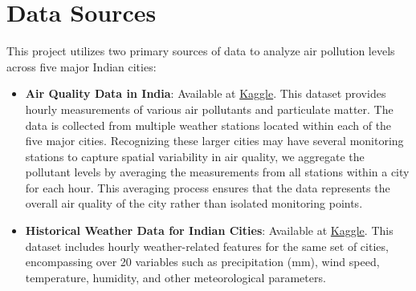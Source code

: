 \documentclass[12pt]{article}
\begin{document}





\newpage




\section{Data Sources}

This project utilizes two primary sources of data to analyze air pollution levels across five major Indian cities:

\begin{itemize}
    \item \textbf{Air Quality Data in India}: Available at \href{https://www.kaggle.com/datasets/rohanrao/air-quality-data-in-india}{Kaggle}. This dataset provides hourly measurements of various air pollutants and particulate matter. The data is collected from multiple weather stations located within each of the five major cities. Recognizing these larger cities may have several monitoring stations to capture spatial variability in air quality, we aggregate the pollutant levels by averaging the measurements from all stations within a city for each hour. This averaging process ensures that the data represents the overall air quality of the city rather than isolated monitoring points.

    \item \textbf{Historical Weather Data for Indian Cities}\cite{hitesh_soneji_2020}: Available at \href{https://www.kaggle.com/datasets/hiteshsoneji/historical-weather-data-for-indian-cities}{Kaggle}. This dataset includes hourly weather-related features for the same set of cities, encompassing over 20 variables such as precipitation (mm), wind speed, temperature, humidity, and other meteorological parameters.
\end{itemize}
\end{document}
